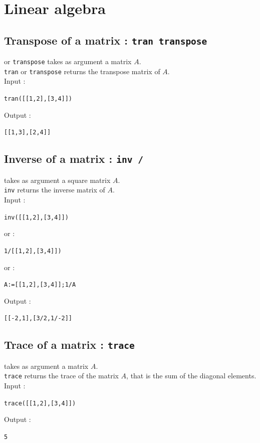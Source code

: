 \documentclass[a4paper,11pt]{book}
\begin{document}
\section{Linear algebra }
\subsection{Transpose of a matrix : {\tt tran transpose}}
 or {\tt transpose} takes as argument a matrix $A$.\\
{\tt tran} or {\tt transpose} returns the transpose matrix of $A$.\\
Input :
\begin{center}{\tt tran([[1,2],[3,4]])}\end{center}
Output :
\begin{center}{\tt [[1,3],[2,4]]}\end{center}

\subsection{Inverse of a matrix : {\tt inv /}}
 takes as argument a square matrix $A$.\\
{\tt inv} returns the inverse matrix of $A$.\\
Input :
\begin{center}{\tt inv([[1,2],[3,4]])}\end{center}
or :
\begin{center}{\tt 1/[[1,2],[3,4]])}\end{center}
or :
\begin{center}{\tt A:=[[1,2],[3,4]];1/A}\end{center}
Output :
\begin{center}{\tt  [[-2,1],[3/2,1/-2]]}\end{center}

\subsection{Trace of a matrix : {\tt trace}}
 takes as argument a matrix $A$.\\
{\tt trace} returns the trace of the matrix $A$, that is 
the sum of the diagonal elements.\\
Input :
\begin{center}{\tt trace([[1,2],[3,4]])}\end{center}
Output :
\begin{center}{\tt  5}\end{center}
\end{document}
